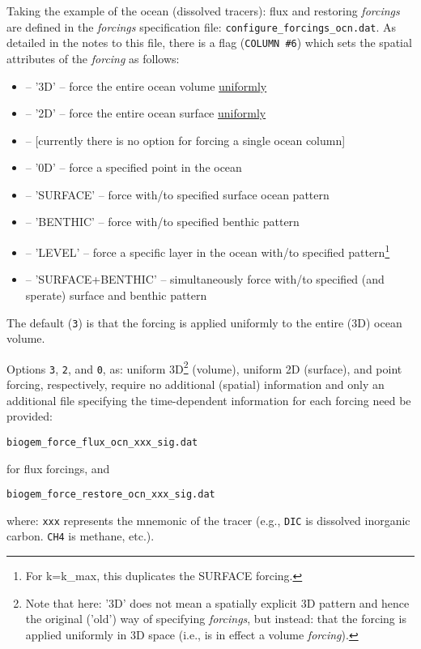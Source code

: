 \documentclass[11pt,fleqn]{book} %
\begin{document}
Taking the example of the ocean (dissolved tracers): flux and restoring \textit{forcings} are defined in the \textit{forcings} specification file: \texttt{configure\_forcings\_ocn.dat}. As detailed in the notes to this file, there is a flag (\texttt{COLUMN \#6}) which sets the spatial attributes of the \textit{forcing} as follows:
\vspace{1mm}
\begin{itemize}[noitemsep]
\item [3] -- '3D' -- force the entire ocean volume \uline{uniformly}
\item [2] -- '2D' -- force the entire ocean surface \uline{uniformly}
\item [1] -- [currently there is no option for forcing a single ocean column]
\item [0] -- '0D' -- force a specified point in the ocean
\item [-1] -- 'SURFACE' -- force with/to specified surface ocean pattern
\item [-2] -- 'BENTHIC' -- force with/to specified benthic pattern
\item [-3] -- 'LEVEL' -- force a specific layer in the ocean with/to specified pattern\footnote{For k=k\_max, this duplicates the SURFACE forcing.}
\item [-4] -- 'SURFACE+BENTHIC' -- simultaneously force with/to specified (and sperate) surface and benthic pattern
\end{itemize}
\vspace{1mm}
The default (\texttt{3}) is that the forcing is applied uniformly to the entire (3D) ocean volume.

Options \texttt{3}, \texttt{2}, and \texttt{0}, as: uniform 3D\footnote{Note that here: '3D' does not mean a spatially explicit 3D pattern and hence the original ('old') way of specifying \textit{forcings}, but instead: that the forcing is applied uniformly in 3D space (i.e., is in effect a volume \textit{forcing}).} (volume), uniform 2D (surface), and point forcing, respectively, require no additional (spatial) information and only an additional file specifying the time-dependent information for each forcing need be provided:
\vspace{-2pt}\small\begin{verbatim}
biogem_force_flux_ocn_xxx_sig.dat
\end{verbatim}\normalsize\vspace{-2pt}
for flux forcings, and
\vspace{-2pt}\small\begin{verbatim}
biogem_force_restore_ocn_xxx_sig.dat
\end{verbatim}\normalsize\vspace{-2pt}
where: \texttt{xxx} represents the mnemonic of the tracer (e.g., \texttt{DIC} is dissolved inorganic carbon. \texttt{CH4} is methane, etc.).
\end{document}

